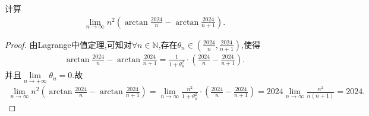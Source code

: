 \documentclass[../../main.tex]{subfiles}%
\begin{document}
\begin{example}
计算
\begin{align*}
\lim_{n \to \infty} n^2 \left(\arctan\frac{2024}{n} - \arctan\frac{2024}{n + 1}\right).
\end{align*}
\end{example}
\begin{proof}

由Lagrange中值定理,可知对$\forall n\in\mathbb{N}$,存在$\theta_n\in(\frac{2024}{n},\frac{2024}{n + 1})$,使得
\begin{align*}
\arctan\frac{2024}{n} - \arctan\frac{2024}{n + 1} = \frac{1}{1+\theta _{n}^{2}}\cdot \left( \frac{2024}{n}-\frac{2024}{n+1} \right).
\end{align*}
并且$\underset{n\rightarrow +\infty}{\lim}\theta _n=0$.故
\begin{align*}
\lim_{n\rightarrow \infty} n^2\left( \arctan \frac{2024}{n}-\arctan \frac{2024}{n+1} \right) =\lim_{n\rightarrow \infty} \frac{n^2}{1+\theta _{n}^{2}}\cdot \left( \frac{2024}{n}-\frac{2024}{n+1} \right) =2024\lim_{n\rightarrow \infty} \frac{n^2}{n\left( n+1 \right)}=2024.
\end{align*}

\end{proof}
\end{document}
